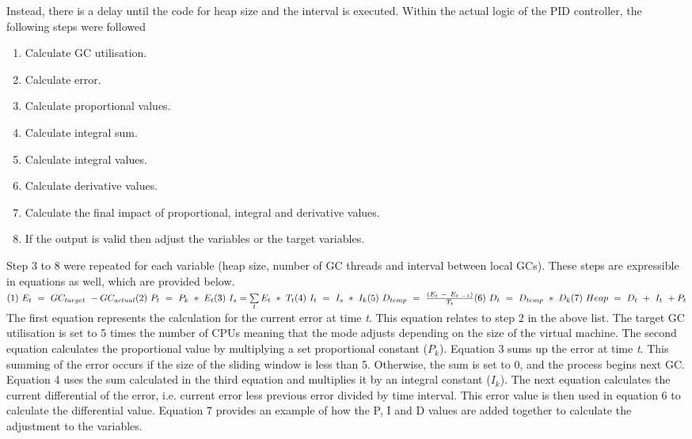 Instead, there is a delay until the code for heap size and the interval
is executed.
\newline\newline
Within the actual logic of the PID controller, the following steps were
followed
\begin{enumerate}
\def\labelenumi{\arabic{enumi}.}
\item
  Calculate GC utilisation.
\item
  Calculate error.
\item
  Calculate proportional values.
\item
  Calculate integral sum.
\item
  Calculate integral values.
\item
  Calculate derivative values.
\item
  Calculate the final impact of proportional, integral and derivative
  values.
\item
  If the output is valid then adjust the variables or the target
  variables.
\end{enumerate}
Step 3 to 8 were repeated for each variable (heap size, number of GC threads and interval between local GCs). These steps are expressible in equations as well, which are provided below.
\newline\newline
\begin{math}[H]
(1)\    E_{t} \ =\ GC_{target} \ -GC_{actual}\\
(2)\     P_{t} \ =\ P_{k} \ *\ E_{t}\\
(3)\ I_{s} =\sum\limits _{t} E_{t} \ *\ T_{t}\\
(4)\ I_{t} \ =\ I_{s\ } *\ I_{k}\\
(5)\ D_{temp} \ =\ \frac{( E_{t} \ -\ E_{t\ -1})}{T_{t}}\\
(6)\ D_{t} \ =\ D_{temp} \ *\ D_{k}\\
(7)\ Heap\ =\ D_{t} \ +\ I_{t} \ +P_{t}
\end{math}
\newline\newline
The first equation represents the calculation for the current error at time \emph{t}. This equation relates to step 2 in the above list. The target GC utilisation is set to 5 times the number of CPUs meaning that the mode adjusts depending on the size of the virtual machine.  The second equation calculates the proportional value by multiplying a set proportional constant (\begin{math}{P_{k}}\end{math}). Equation 3 sums up the error at time \emph{t}. This summing of the error occurs if the size of the sliding window is less than 5. Otherwise, the sum is set to 0, and the process begins next GC. Equation 4 uses the sum calculated in the third equation and multiplies it by an integral constant (\begin{math} {I_{k}}\end{math}). The next equation calculates the current differential of the error, i.e. current error less previous error divided by time interval. This error value is then used in equation 6 to calculate the differential value. Equation 7 provides an example of how the P, I and D values are added together to calculate the adjustment to the variables. 
